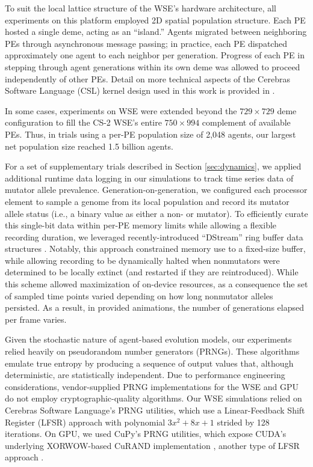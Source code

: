 To suit the local lattice structure of the WSE's hardware architecture, all experiments on this platform employed 2D spatial population structure.
Each PE hosted a single deme, acting as an ``island.''
Agents migrated between neighboring PEs through asynchronous message passing;
in practice, each PE dispatched approximately one agent to each neighbor per generation.
Progress of each PE in stepping through agent generations within its own deme was allowed to proceed independently of other PEs.
Detail on more technical aspects of the Cerebras Software Language (CSL) kernel design used in this work is provided in \citet{moreno2024trackable}.

In some cases, experiments on WSE were extended beyond the $729 \times 729$ deme configuration to fill the CS-2 WSE's entire $750 \times 994$ complement of available PEs.
Thus, in trials using a per-PE population size of 2,048 agents, our largest net population size reached 1.5 billion agents.

For a set of supplementary trials described in Section \ref{sec:dynamics}, we applied additional runtime data logging in our simulations to track time series data of mutator allele prevalence.
Generation-on-generation, we configured each processor element to sample a genome from its local population and record its mutator allele status (i.e., a binary value as either a non- or mutator).
To efficiently curate this single-bit data within per-PE memory limits while allowing a flexible recording duration, we leveraged recently-introduced ``DStream'' ring buffer data structures \citep{moreno2024algorithms}.
Notably, this approach constrained memory use to a fixed-size buffer, while allowing recording to be dynamically halted when nonmutators were determined to be locally extinct (and restarted if they are reintroduced).
While this scheme allowed maximization of on-device resources, as a consequence the set of sampled time points varied depending on how long nonmutator alleles persisted.
As a result, in provided animations, the number of generations elapsed per frame varies.


Given the stochastic nature of agent-based evolution models, our experiments relied heavily on pseudorandom number generators (PRNGs).
These algorithms emulate true entropy by producing a sequence of output values that, although deterministic, are statistically independent.
Due to performance engineering considerations, vendor-supplied PRNG implementations for the WSE and GPU do not employ cryptographic-quality algorithms.
Our WSE simulations relied on Cerebras Software Language's PRNG utilities, which use a Linear-Feedback Shift Register (LFSR) approach with polynomial $3x^2 + 8x + 1$ strided by 128 iterations.
On GPU, we used CuPy's PRNG utilities, which expose CUDA's underlying XORWOW-based CuRAND implementation \citep{marsaglia2003xorshift}, another type of LFSR approach \citep{brent2004note}.

